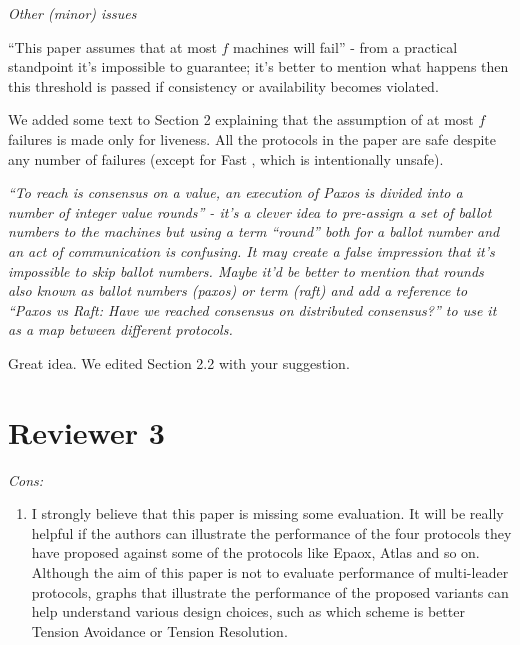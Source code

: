 \documentclass[letterpaper,twocolumn,10pt]{article}
\newenvironment{reviewerquote}
{\list{}{\leftmargin=\parindent\rightmargin=0in}\item[] \itshape \color{ReviewerDarkGray}}%
{\endlist}
\begin{document}
\begin{reviewerquote}
  Other (minor) issues

  ``This paper assumes that at most $f$ machines will fail'' - from a practical
  standpoint it's impossible to guarantee; it's better to mention what happens
  then this threshold is passed if consistency or availability becomes
  violated.
\end{reviewerquote}

We added some text to Section 2 explaining that the assumption of at most $f$
failures is made only for liveness. All the protocols in the paper are safe
despite any number of failures (except for Fast \BPaxos{}, which is
intentionally unsafe).

\begin{reviewerquote}
  ``To reach is consensus on a value, an execution of Paxos is divided into a
  number of integer value rounds'' - it's a clever idea to pre-assign a set of
  ballot numbers to the machines but using a term ``round'' both for a ballot
  number and an act of communication is confusing. It may create a false
  impression that it's impossible to skip ballot numbers. Maybe it'd be better
  to mention that rounds also known as ballot numbers (paxos) or term (raft)
  and add a reference to ``Paxos vs Raft: Have we reached consensus on
  distributed consensus?'' to use it as a map between different protocols.
\end{reviewerquote}

Great idea. We edited Section 2.2 with your suggestion.

\section*{Reviewer 3}
\begin{reviewerquote}
  Cons:

  \begin{enumerate}
    \setcounter{enumi}{0}
    \item
      I strongly believe that this paper is missing some evaluation. It will be
      really helpful if the authors can illustrate the performance of the four
      protocols they have proposed against some of the protocols like Epaox,
      Atlas and so on. Although the aim of this paper is not to evaluate
      performance of multi-leader protocols, graphs that illustrate the
      performance of the proposed variants can help understand various design
      choices, such as which scheme is better Tension Avoidance or Tension
      Resolution.
  \end{enumerate}
\end{reviewerquote}
\end{document}
